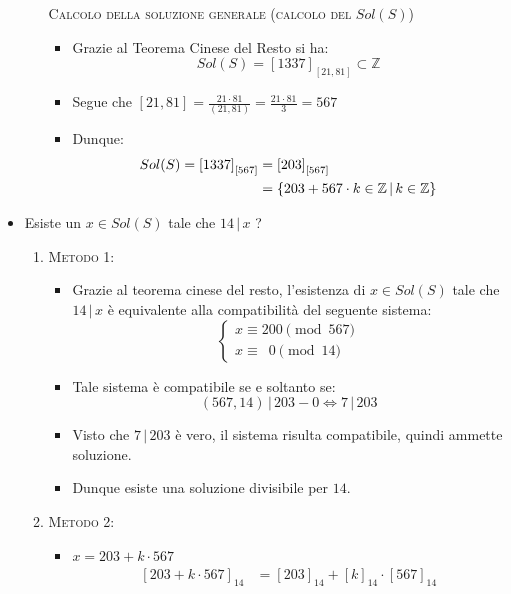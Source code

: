 \documentclass[10pt]{article}
\begin{document}
\begin{itemize}
\begin{enumerate}
	\textsc{Calcolo della soluzione generale (calcolo del $Sol(S)$)}
	\begin{itemize}
	\item
	Grazie al Teorema Cinese del Resto si ha: $$Sol(S) = \left[1337\right]_{\left[21,81\right]} \subset \mathbb{Z}$$ \smallskip
	\item
	Segue che $\displaystyle{\left[21,81\right] = \frac{21 \cdot 81}{(21,81)} = \frac{21 \cdot 81}{3} = 567}$
	\item
	Dunque:
	\begin{equation}
	\begin{split}
	Sol(S) = \left[1337\right]_{\left[567\right]} &= \left[203\right]_{\left[567\right]} \\
	&= \{203 + 567 \cdot k \in \mathbb{Z} \,|\, k \in \mathbb{Z} \}
	\notag
	\end{split}
	\end{equation}
	\end{itemize}
	\end{enumerate}	
	\item
	Esiste un $x \in Sol(S)$ tale che $14\,|\,x$ ?
	\begin{enumerate}
	\item	
	\textsc{Metodo 1:}
	\begin{itemize}
	\item
	Grazie al teorema cinese del resto, l'esistenza di $x \in Sol(S)$ tale che $14\,|\,x$ è equivalente alla compatibilità del seguente sistema:
	\[
	\begin{cases}
	x \equiv 200 \!\!\!\pmod{567} \\
	x \equiv \,\,\, 0 \pmod{14}
	\end{cases}
	\]
	\item
	Tale sistema è compatibile se e soltanto se:
	$$(567,14)\,|\, 203 - 0 \Longleftrightarrow 7 \,|\, 203$$
	\item
	Visto che $7 \,|\, 203$ è vero, il sistema risulta compatibile, quindi ammette soluzione.
	\item
	Dunque esiste una soluzione divisibile per $14$.
	\end{itemize}
	\item	
	\textsc{Metodo 2:}
	\begin{itemize}
	\item
	$x = 203 + k \cdot 567$
	\begin{equation}
	\begin{split}
	\left[203 + k \cdot 567\right]_{14} &= \left[203\right]_{14} + \left[k\right]_{14} \cdot \left[567\right]_{14} \\

\end{split}
\end{equation}
\end{itemize}
\end{enumerate}
\end{itemize}
\end{document}
